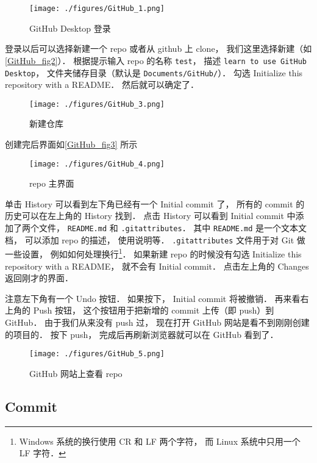 \begin{figure}[ht]
\centering
\texttt{[image: ./figures/GitHub\_1.png]}
\caption{GitHub Desktop 登录} \label{GitHub_fig1}
\end{figure}

登录以后可以选择新建一个 repo 或者从 github 上 clone， 我们这里选择新建（如\autoref{GitHub_fig2}）． 根据提示输入 repo 的名称 \verb|test|， 描述 \verb|learn to use GitHub Desktop|， 文件夹储存目录（默认是 \verb|Documents/GitHub/|）． 勾选 Initialize this repository with a README． 然后就可以确定了．

\begin{figure}[ht]
\centering
\texttt{[image: ./figures/GitHub\_3.png]}
\caption{新建仓库} \label{GitHub_fig2}
\end{figure}

创建完后界面如\autoref{GitHub_fig3} 所示
\begin{figure}[ht]
\centering
\texttt{[image: ./figures/GitHub\_4.png]}
\caption{repo 主界面} \label{GitHub_fig3}
\end{figure}

单击 History 可以看到左下角已经有一个 Initial commit 了， 所有的 commit 的历史可以在左上角的 History 找到． 点击 History 可以看到 Initial commit 中添加了两个文件， \verb|README.md| 和 \verb|.gitattributes|． 其中 \verb|README.md| 是一个文本文档， 可以添加 repo 的描述， 使用说明等． \verb|.gitattributes| 文件用于对 Git 做一些设置， 例如如何处理换行\footnote{Windows 系统的换行使用 CR 和 LF 两个字符， 而 Linux 系统中只用一个 LF 字符．}． 如果新建 repo 的时候没有勾选 Initialize this repository with a README， 就不会有 Initial commit． 点击左上角的 Changes 返回刚才的界面．

注意左下角有一个 Undo 按钮． 如果按下， Initial commit 将被撤销． 再来看右上角的 Push 按钮， 这个按钮用于把新增的 commit 上传（即 push）到 GitHub． 由于我们从来没有 push 过， 现在打开 GitHub 网站是看不到刚刚创建的项目的． 按下 push， 完成后再刷新浏览器就可以在 GitHub 看到了．
\begin{figure}[ht]
\centering
\texttt{[image: ./figures/GitHub\_5.png]}
\caption{GitHub 网站上查看 repo} \label{GitHub_fig5}
\end{figure}

\subsection{Commit}
